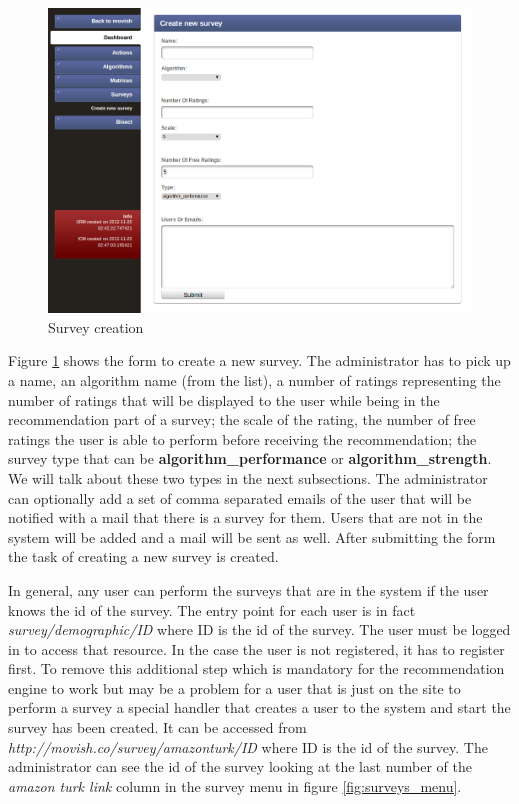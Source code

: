 \begin{figure}
  \centering
  \includegraphics[width=\textwidth]{figures/survey_creation.png}
  \caption{Survey creation}
  \label{fig:survey_creation}
\end{figure}

Figure \ref{fig:survey_creation} shows the form to create a new survey. The administrator has to pick up a name, an algorithm name (from the list), a number of ratings representing the number of ratings that will be displayed to the user while being in the recommendation part of a survey; the scale of the rating, the number of free ratings the user is able to perform before receiving the recommendation; the survey type that can be \textbf{algorithm\_performance} or \textbf{algorithm\_strength}. We will talk about these two types in the next subsections. The administrator can optionally add a set of comma separated emails of the user that will be notified with a mail that there is a survey for them. Users that are not in the system will be added and a mail will be sent as well. After submitting the form the task of creating a new survey is created. 

In general, any user can perform the surveys that are in the system if the user knows the id of the survey. The entry point for each user is in fact \textit{survey/demographic/ID} where ID is the id of the survey. The user must be logged in to access that resource. In the case the user is not registered, it has to register first. To remove this additional step which is mandatory for the recommendation engine to work but may be a problem for a user that is just on the site to perform a survey a special handler that creates a user to the system and start the survey has been created. It can be accessed from \textit{http://movish.co/survey/amazonturk/ID} where ID is the id of the survey. The administrator can see the id of the survey looking at the last number of the \textit{amazon turk link} column in the survey menu in figure \ref{fig:surveys_menu}.

